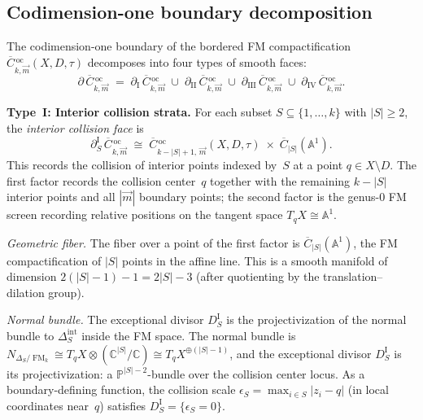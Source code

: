 \subsection{Codimension-one boundary decomposition}
\label{subsec:boundary-decomposition}

\begin{proposition}
\label{prop:four-type-boundary}
The codimension-one boundary of the bordered FM
compactification
$\overline{C}{}^{\,\mathrm{oc}}_{k,\vec{m}}(X, D, \tau)$
decomposes into four types of smooth faces:
\begin{equation}\label{eq:boundary-four-types}
\partial\,\overline{C}{}^{\,\mathrm{oc}}_{k,\vec{m}}
\;=\;
\partial_{\mathrm{I}}\,\overline{C}{}^{\,\mathrm{oc}}_{k,\vec{m}}
\;\cup\;
\partial_{\mathrm{II}}\,\overline{C}{}^{\,\mathrm{oc}}_{k,\vec{m}}
\;\cup\;
\partial_{\mathrm{III}}\,\overline{C}{}^{\,\mathrm{oc}}_{k,\vec{m}}
\;\cup\;
\partial_{\mathrm{IV}}\,\overline{C}{}^{\,\mathrm{oc}}_{k,\vec{m}}.
\end{equation}

\medskip
\noindent\textbf{Type~I: Interior collision strata.}
For each subset $S \subseteq \{1, \ldots, k\}$ with
$|S| \geq 2$, the \emph{interior collision face} is
\begin{equation}\label{eq:typeI-stratum}
\partial_S^{\mathrm{I}}\,
\overline{C}{}^{\,\mathrm{oc}}_{k,\vec{m}}
\;\cong\;
\overline{C}{}^{\,\mathrm{oc}}_{k-|S|+1,\, \vec{m}}
(X, D, \tau)
\;\times\;
\overline{C}_{|S|}(\mathbb{A}^1).
\end{equation}
This records the collision of interior points indexed by~$S$
at a point $q \in X \setminus D$.  The first factor records the
collision center~$q$ together with the remaining $k - |S|$
interior points and all $|\vec{m}|$ boundary points; the second
factor is the genus-$0$ FM screen recording relative positions on
the tangent space $T_q X \cong \mathbb{A}^1$.

\emph{Geometric fiber.}
The fiber over a point of the first factor is
$\overline{C}_{|S|}(\mathbb{A}^1)$, the FM compactification of
$|S|$ points in the affine line.  This is a smooth manifold of
dimension $2(|S| - 1) - 1 = 2|S| - 3$ (after quotienting by the
translation--dilation group).

\emph{Normal bundle.}
The exceptional divisor $D_S^{\mathrm{I}}$ is the projectivization
of the normal bundle to $\Delta_S^{\mathrm{int}}$ inside the FM
space.  The normal bundle is
$N_{\Delta_S/\operatorname{FM}_k} \cong
T_q X \otimes (\mathbb{C}^{|S|}/\mathbb{C})
\cong T_q X^{\oplus(|S|-1)}$,
and the exceptional divisor $D_S^{\mathrm{I}}$ is its
projectivization: a $\mathbb{P}^{|S|-2}$-bundle over
the collision center locus.
As a boundary-defining function, the collision scale
$\epsilon_S = \max_{i \in S} |z_i - q|$ (in local coordinates
near~$q$) satisfies $D_S^{\mathrm{I}} = \{\epsilon_S = 0\}$.


\end{proposition}

